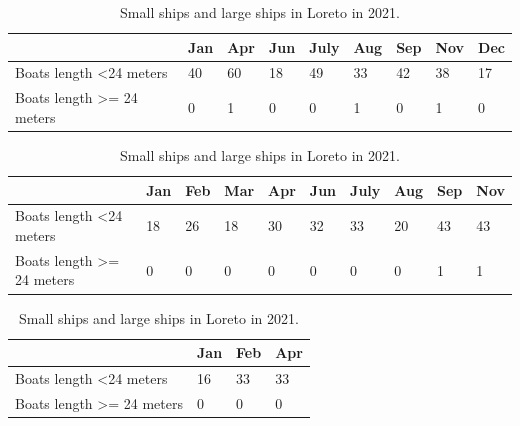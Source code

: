 \begin{table}[h!]
\begin{tabular}{|l|l|l|l|l|l|l|l|l|}
\hline
                                       & Jan & Apr & Jun & July & Aug & Sep & Nov & Dec \\ \hline
Boats length \textless 24 meters       & 40  & 60  & 18  & 49   & 33  & 42  & 38  & 17  \\ \hline
Boats length \textgreater{}= 24 meters & 0   & 1   & 0   & 0    & 1   & 0   & 1   & 0   \\ \hline
\end{tabular}
\caption{Small ships and large ships in Loreto in 2019.}



\begin{tabular}{|l|l|l|l|l|l|l|l|l|l|}
\hline
                                       & Jan & Feb & Mar & Apr & Jun & July & Aug & Sep & Nov \\ \hline
Boats length \textless 24 meters       & 18  & 26  & 18  & 30  & 32  & 33   & 20  & 43  & 43  \\ \hline
Boats length \textgreater{}= 24 meters & 0   & 0   & 0   & 0   & 0   & 0    & 0   & 1   & 1   \\ \hline
\end{tabular}
\caption{Small ships and large ships in Loreto in 2020.}


\begin{tabular}{|l|l|l|l|}
\hline
                                       & Jan & Feb & Apr \\ \hline
Boats length \textless 24 meters       & 16  & 33  & 33  \\ \hline
Boats length \textgreater{}= 24 meters & 0   & 0   & 0   \\ \hline
\end{tabular}
\caption{Small ships and large ships in Loreto in 2021.}
\end{table}


